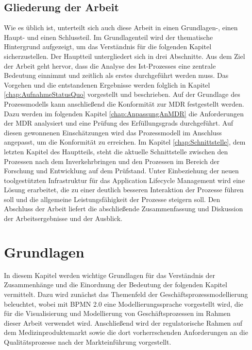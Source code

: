 \documentclass[a4paper,12pt]{report}
\begin{document}
\section{Gliederung der Arbeit}
Wie es üblich ist, unterteilt sich auch diese Arbeit in einen Grundlagen-, einen Haupt- und einen Schlussteil. Im Grundlagenteil wird der thematische Hintergrund aufgezeigt, um das Verständnis für die folgenden Kapitel sicherzustellen. Der Hauptteil untergliedert sich in drei Abschnitte. Aus dem Ziel der Arbeit geht hervor, dass die Analyse des Ist-Prozesses eine zentrale Bedeutung einnimmt und zeitlich als erstes durchgeführt werden muss. Das Vorgehen und die entstandenen Ergebnisse werden folglich in Kapitel \ref{chap:AufnahmeStatusQuo} vorgestellt und beschrieben. Auf der Grundlage des Prozessmodells kann anschließend die Konformität zur MDR festgestellt werden. Dazu werden im folgenden Kapitel \ref{chap:AnpassungAnMDR} die Anforderungen der MDR analysiert und eine Prüfung des Erfüllungsgrads durchgeführt. Auf diesen gewonnenen Einschätzungen wird das Prozessmodell im Anschluss angepasst, um die Konformität zu erreichen. Im Kapitel \ref{chap:Schnittstelle}, dem letzten Kapitel des Hauptteils, steht die aktuelle Schnittstelle zwischen den Prozessen nach dem Inverkehrbringen und den Prozessen im Bereich der Forschung und Entwicklung auf dem Prüfstand. Unter Einbeziehung der neuen toolgestützten Infrastruktur für das Application Lifecycle Management wird eine Lösung erarbeitet, die zu einer deutlich besseren Interaktion der Prozesse führen soll und die allgemeine Leistungsfähigkeit der Prozesse steigern soll. Den Abschluss der Arbeit liefert die abschließende Zusammenfassung und Diskussion der Arbeitsergebnisse und der Ausblick.

\chapter{Grundlagen}\label{chap:Grundlagen}
In diesem Kapitel werden wichtige Grundlagen für das Verständnis der Zusammenhänge und die Einordnung der Bedeutung der folgenden Kapitel vermittelt. Dazu wird zunächst das Themenfeld der Geschäftsprozessmodellierung beleuchtet, wobei mit BPMN 2.0 eine Modellierungssprache vorgestellt wird, die für die Visualisierung und Modellierung von Geschäftsprozessen im Rahmen dieser Arbeit verwendet wird. Anschließend wird der regulatorische Rahmen auf dem Medizinproduktemarkt sowie die dort vorherrschenden Anforderungen an die Qualitätsprozesse nach der Markteinführung vorgestellt.
\end{document}
